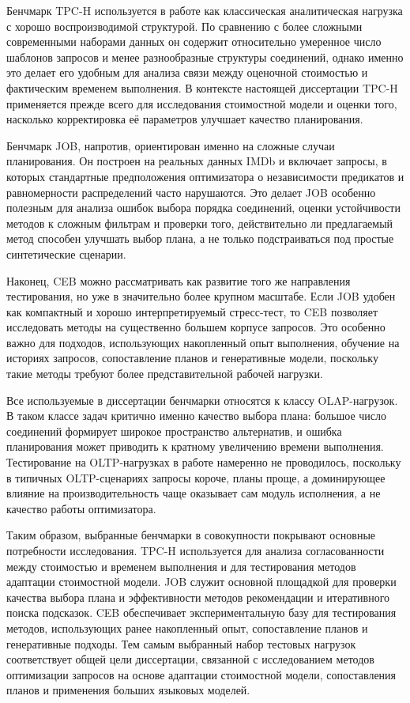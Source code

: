 Бенчмарк TPC-H используется в работе как классическая аналитическая нагрузка с хорошо воспроизводимой структурой. По сравнению с более сложными современными наборами данных он содержит относительно умеренное число шаблонов запросов и менее разнообразные структуры соединений, однако именно это делает его удобным для анализа связи между оценочной стоимостью и фактическим временем выполнения. В контексте настоящей диссертации TPC-H применяется прежде всего для исследования стоимостной модели и оценки того, насколько корректировка её параметров улучшает качество планирования.

Бенчмарк JOB, напротив, ориентирован именно на сложные случаи планирования. Он построен на реальных данных IMDb и включает запросы, в которых стандартные предположения оптимизатора о независимости предикатов и равномерности распределений часто нарушаются. Это делает JOB особенно полезным для анализа ошибок выбора порядка соединений, оценки устойчивости методов к сложным фильтрам и проверки того, действительно ли предлагаемый метод способен улучшать выбор плана, а не только подстраиваться под простые синтетические сценарии.

Наконец, CEB можно рассматривать как развитие того же направления тестирования, но уже в значительно более крупном масштабе. Если JOB удобен как компактный и хорошо интерпретируемый стресс-тест, то CEB позволяет исследовать методы на существенно большем корпусе запросов. Это особенно важно для подходов, использующих накопленный опыт выполнения, обучение на историях запросов, сопоставление планов и генеративные модели, поскольку такие методы требуют более представительной рабочей нагрузки.

Все используемые в диссертации бенчмарки относятся к классу OLAP-нагрузок. В таком классе задач критично именно качество выбора плана: большое число соединений формирует широкое пространство альтернатив, и ошибка планирования может приводить к кратному увеличению времени выполнения. Тестирование на OLTP-нагрузках в работе намеренно не проводилось, поскольку в типичных OLTP-сценариях запросы короче, планы проще, а доминирующее влияние на производительность чаще оказывает сам модуль исполнения, а не качество работы оптимизатора.

Таким образом, выбранные бенчмарки в совокупности покрывают основные потребности исследования. TPC-H используется для анализа согласованности между стоимостью и временем выполнения и для тестирования методов адаптации стоимостной модели. JOB служит основной площадкой для проверки качества выбора плана и эффективности методов рекомендации и итеративного поиска подсказок. CEB обеспечивает экспериментальную базу для тестирования методов, использующих ранее накопленный опыт, сопоставление планов и генеративные подходы. Тем самым выбранный набор тестовых нагрузок соответствует общей цели диссертации, связанной с исследованием методов оптимизации запросов на основе адаптации стоимостной модели, сопоставления планов и применения больших языковых моделей.

